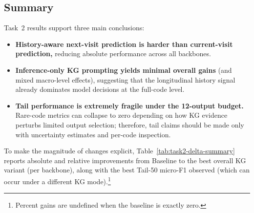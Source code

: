
\subsection{Summary}
\label{subsec:results-task2-summary}

Task~2 results support three main conclusions:
\begin{itemize}
    \item \textbf{History-aware next-visit prediction is harder than current-visit prediction,} reducing absolute performance across all backbones.
    \item \textbf{Inference-only KG prompting yields minimal overall gains} (and mixed macro-level effects), suggesting that the longitudinal history signal already dominates model decisions at the full-code level.
    \item \textbf{Tail performance is extremely fragile under the 12-output budget.} Rare-code metrics can collapse to zero depending on how KG evidence perturbs limited output selection; therefore, tail claims should be made only with uncertainty estimates and per-code inspection.
\end{itemize}

To make the magnitude of changes explicit, Table~\ref{tab:task2-delta-summary} reports absolute and relative improvements from Baseline to the best overall KG variant (per backbone), along with the best Tail-50 micro-F1 observed (which can occur under a different KG mode).\footnote{Percent gains are undefined when the baseline is exactly zero.}

